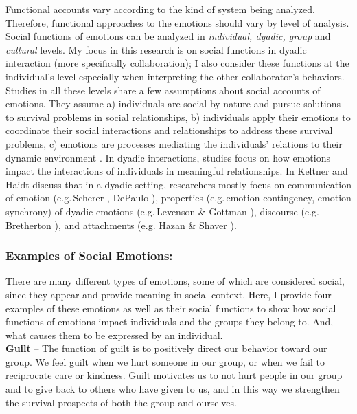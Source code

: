 \documentclass[12pt]{report}
\begin{document}
Functional accounts vary according to the kind of system being analyzed.
Therefore, functional approaches to the emotions should vary by level of
analysis. Social functions of emotions can be analyzed in \textit{individual,
dyadic, group} and \textit{cultural} levels. My focus in this research is
on social functions in dyadic interaction (more specifically collaboration); I
also consider these functions at the individual's level especially when
interpreting the other collaborator's behaviors. Studies in all these levels
share a few assumptions about social accounts of emotions. They assume a)
individuals are social by nature and pursue solutions to survival problems in
social relationships, b) individuals apply their emotions to coordinate their
social interactions and relationships to address these survival problems, c)
emotions are processes mediating the individuals' relations to their dynamic
environment \cite{keltner:emotion-functions}. In dyadic interactions, studies
focus on how emotions impact the interactions of individuals in meaningful
relationships. In \cite{keltner:emotion-functions} Keltner and Haidt discuss
that in a dyadic setting, researchers mostly focus on communication of emotion
(e.g.\,Scherer \cite{scherer:vocal-expression}, DePaulo
\cite{depaulo:nonverbal-behavior}), properties (e.g.\,emotion contingency,
emotion synchrony) of dyadic emotions (e.g.\,Levenson \& Gottman
\cite{levenson:affective-exchange}), discourse (e.g.\,Bretherton
\cite{bretherton:emotions-functionalist}), and attachments (e.g. Hazan \& Shaver
\cite{hazan:emotion-attachment}).

\subsubsection{Examples of Social Emotions:}

There are many different types of emotions, some of which are considered social,
since they appear and provide meaning in social context. Here, I provide four
examples of these emotions as well as their social functions to show how social
functions of emotions impact individuals and the groups they belong to. And,
what causes them to be expressed by an individual.\\

\noindent \textbf{Guilt} -- The function of guilt is to positively direct our
behavior toward our group. We feel guilt when we hurt someone in our group, or
when we fail to reciprocate care or kindness. Guilt motivates us to not hurt
people in our group and to give back to others who have given to us, and in this
way we strengthen the survival prospects of both the group and ourselves.
\end{document}
